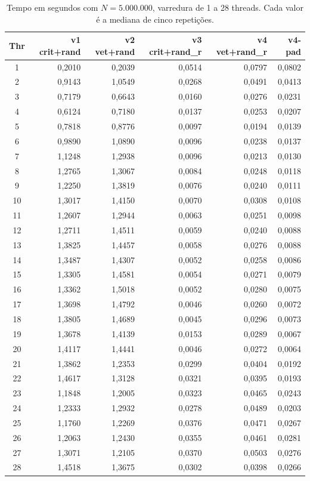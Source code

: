 \documentclass[11pt,letterpaper]{article}
\begin{document}
\begin{table}[H]
\centering
\caption{Tempo em segundos com $N=5.000.000$, varredura de 1 a 28 threads. Cada valor é a mediana de cinco repetições.}
\label{tab:tempos}
{\scriptsize
\begin{tabular}{crrrrr}
\hline
\textbf{Thr} & \textbf{v1 crit+rand} & \textbf{v2 vet+rand} & \textbf{v3 crit+rand\_r} & \textbf{v4 vet+rand\_r} & \textbf{v4-pad} \\ \hline
1 & 0,2010 & 0,2039 & 0,0514 & 0,0797 & 0,0802 \\
2 & 0,9143 & 1,0549 & 0,0268 & 0,0491 & 0,0413 \\
3 & 0,7179 & 0,6643 & 0,0160 & 0,0276 & 0,0231 \\
4 & 0,6124 & 0,7180 & 0,0137 & 0,0253 & 0,0207 \\
5 & 0,7818 & 0,8776 & 0,0097 & 0,0194 & 0,0139 \\
6 & 0,9890 & 1,0890 & 0,0096 & 0,0238 & 0,0137 \\
7 & 1,1248 & 1,2938 & 0,0096 & 0,0213 & 0,0130 \\
8 & 1,2765 & 1,3067 & 0,0084 & 0,0248 & 0,0118 \\
9 & 1,2250 & 1,3819 & 0,0076 & 0,0240 & 0,0111 \\
10 & 1,3017 & 1,4150 & 0,0070 & 0,0308 & 0,0108 \\
11 & 1,2607 & 1,2944 & 0,0063 & 0,0251 & 0,0098 \\
12 & 1,2711 & 1,4511 & 0,0059 & 0,0240 & 0,0088 \\
13 & 1,3825 & 1,4457 & 0,0058 & 0,0276 & 0,0088 \\
14 & 1,3487 & 1,4307 & 0,0052 & 0,0258 & 0,0086 \\
15 & 1,3305 & 1,4581 & 0,0054 & 0,0271 & 0,0079 \\
16 & 1,3362 & 1,5018 & 0,0052 & 0,0280 & 0,0075 \\
17 & 1,3698 & 1,4792 & 0,0046 & 0,0260 & 0,0072 \\
18 & 1,3805 & 1,4689 & 0,0045 & 0,0296 & 0,0073 \\
19 & 1,3678 & 1,4139 & 0,0153 & 0,0289 & 0,0067 \\
20 & 1,4117 & 1,4441 & 0,0046 & 0,0272 & 0,0064 \\
21 & 1,3862 & 1,2353 & 0,0299 & 0,0404 & 0,0192 \\
22 & 1,4617 & 1,3128 & 0,0321 & 0,0395 & 0,0193 \\
23 & 1,1848 & 1,2005 & 0,0323 & 0,0465 & 0,0243 \\
24 & 1,2333 & 1,2932 & 0,0278 & 0,0489 & 0,0203 \\
25 & 1,1760 & 1,2269 & 0,0376 & 0,0471 & 0,0267 \\
26 & 1,2063 & 1,2430 & 0,0355 & 0,0461 & 0,0281 \\
27 & 1,3071 & 1,2105 & 0,0370 & 0,0503 & 0,0276 \\
28 & 1,4518 & 1,3675 & 0,0302 & 0,0398 & 0,0266 \\ \hline
\end{tabular}}
\end{table}
\end{document}

